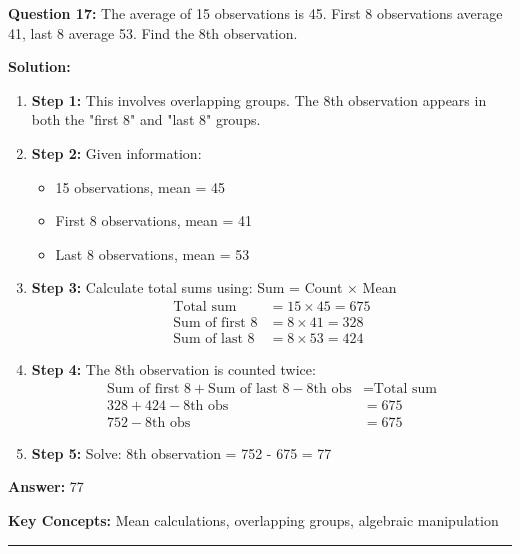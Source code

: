 \textbf{Question 17:} The average of 15 observations is 45. First 8 observations average 41, last 8 average 53. Find the 8th observation.

\textbf{Solution:}
\begin{enumerate}
\item \textbf{Step 1:} This involves overlapping groups. The 8th observation appears in both the "first 8" and "last 8" groups.

\item \textbf{Step 2:} Given information:
\begin{itemize}
\item 15 observations, mean = 45
\item First 8 observations, mean = 41
\item Last 8 observations, mean = 53
\end{itemize}

\item \textbf{Step 3:} Calculate total sums using: Sum = Count × Mean
\begin{align}
\text{Total sum} &= 15 \times 45 = 675 \\
\text{Sum of first 8} &= 8 \times 41 = 328 \\
\text{Sum of last 8} &= 8 \times 53 = 424
\end{align}

\item \textbf{Step 4:} The 8th observation is counted twice:
\begin{align}
\text{Sum of first 8} + \text{Sum of last 8} - \text{8th obs} &= \text{Total sum} \\
328 + 424 - \text{8th obs} &= 675 \\
752 - \text{8th obs} &= 675
\end{align}

\item \textbf{Step 5:} Solve: 8th observation = 752 - 675 = 77
\end{enumerate}

\textbf{Answer:} 77

\textbf{Key Concepts:} Mean calculations, overlapping groups, algebraic manipulation

\hrule
\vspace{1em}
